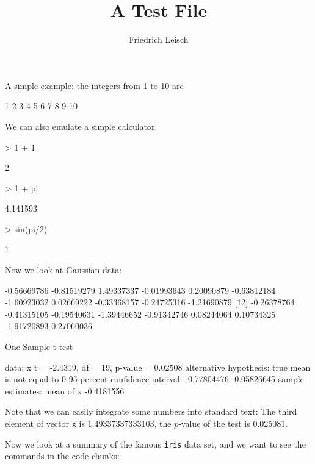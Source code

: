 \documentclass[a4paper]{article}
\title{A Test File}
\author{Friedrich Leisch}
\begin{document}
\maketitle

A simple example: the integers from 1 to 10 are
\begin{Schunk}
\begin{Soutput}
 [1]  1  2  3  4  5  6  7  8  9 10
\end{Soutput}
\end{Schunk}

We can also emulate a simple calculator:
\begin{Schunk}
\begin{Sinput}
> 1 + 1
\end{Sinput}
\begin{Soutput}
[1] 2
\end{Soutput}
\begin{Sinput}
> 1 + pi
\end{Sinput}
\begin{Soutput}
[1] 4.141593
\end{Soutput}
\begin{Sinput}
> sin(pi/2)
\end{Sinput}
\begin{Soutput}
[1] 1
\end{Soutput}
\end{Schunk}

Now we look at Gaussian data:

\begin{Schunk}
\begin{Soutput}
 [1] -0.56669786 -0.81519279  1.49337337 -0.01993643  0.20090879 -0.63812184 -1.60923032  0.02669222 -0.33368157 -0.24725316 -1.21690879
[12] -0.26378764 -0.41315105 -0.19540631 -1.39446652 -0.91342746  0.08244064  0.10734325 -1.91720893  0.27060036
\end{Soutput}
\begin{Soutput}
	One Sample t-test

data:  x
t = -2.4319, df = 19, p-value = 0.02508
alternative hypothesis: true mean is not equal to 0
95 percent confidence interval:
 -0.77804476 -0.05826645
sample estimates:
 mean of x 
-0.4181556 
\end{Soutput}
\end{Schunk}
Note that we can easily integrate some numbers into standard text: The
third element of vector \texttt{x} is 1.49337337333103, the
$p$-value of the test is 0.025081. %

Now we look at a summary of the famous \texttt{iris} data set, and we
want to see the commands in the code chunks:
\end{document}
